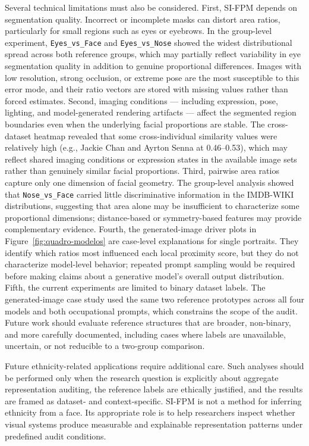 \documentclass{article}
\begin{document}
Several technical limitations must also be considered. First, SI-FPM depends on segmentation quality. Incorrect or incomplete masks can distort area ratios, particularly for small regions such as eyes or eyebrows. In the group-level experiment, \texttt{Eyes\_vs\_Face} and \texttt{Eyes\_vs\_Nose} showed the widest distributional spread across both reference groups, which may partially reflect variability in eye segmentation quality in addition to genuine proportional differences. Images with low resolution, strong occlusion, or extreme pose are the most susceptible to this error mode, and their ratio vectors are stored with missing values rather than forced estimates. Second, imaging conditions — including expression, pose, lighting, and model-generated rendering artifacts — affect the segmented region boundaries even when the underlying facial proportions are stable. The cross-dataset heatmap revealed that some cross-individual similarity values were relatively high (e.g., Jackie Chan and Ayrton Senna at 0.46--0.53), which may reflect shared imaging conditions or expression states in the available image sets rather than genuinely similar facial proportions. Third, pairwise area ratios capture only one dimension of facial geometry. The group-level analysis showed that \texttt{Nose\_vs\_Face} carried little discriminative information in the IMDB-WIKI distributions, suggesting that area alone may be insufficient to characterize some proportional dimensions; distance-based or symmetry-based features may provide complementary evidence. Fourth, the generated-image driver plots in Figure~\ref{fig:quadro-modelos} are case-level explanations for single portraits. They identify which ratios most influenced each local proximity score, but they do not characterize model-level behavior; repeated prompt sampling would be required before making claims about a generative model's overall output distribution. Fifth, the current experiments are limited to binary dataset labels. The generated-image case study used the same two reference prototypes across all four models and both occupational prompts, which constrains the scope of the audit. Future work should evaluate reference structures that are broader, non-binary, and more carefully documented, including cases where labels are unavailable, uncertain, or not reducible to a two-group comparison.

Future ethnicity-related applications require additional care. Such analyses should be performed only when the research question is explicitly about aggregate representation auditing, the reference labels are ethically justified, and the results are framed as dataset- and context-specific. SI-FPM is not a method for inferring ethnicity from a face. Its appropriate role is to help researchers inspect whether visual systems produce measurable and explainable representation patterns under predefined audit conditions.
\end{document}

